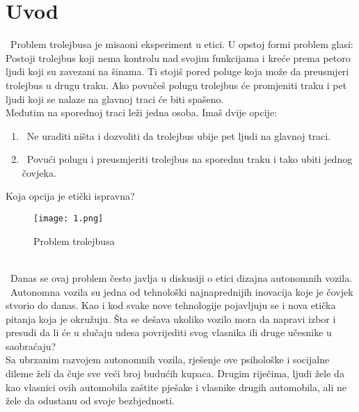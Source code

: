 \documentclass[a4paper]{article}
\begin{document}
\section{Uvod}
\label{sec:uvod}
\indent~Problem trolejbusa je misaoni eksperiment u etici. U opstoj formi problem glasi: Postoji trolejbus koji nema kontrolu nad svojim funkcijama i kreće prema petoro ljudi koji su zavezani na šinama. Ti stojiš pored poluge koja može da preusmjeri trolejbus u drugu traku. Ako povučeš polugu trolejbus će promjeniti traku i pet ljudi koji se nalaze na glavnoj traci će biti spašeno.\\
Međutim na sporednoj traci leži jedna osoba. Imaš dvije opcije:
\begin{enumerate}
\item~Ne uraditi ništa i dozvoliti da trolejbus ubije pet ljudi na glavnoj traci.
\item~Povući polugu i preusmjeriti trolejbus na sporednu traku i tako ubiti jednog čovjeka.
\end{enumerate}
Koja opcija je etički ispravna?
\begin{figure}[!h]
\begin{center}
\texttt{[image: 1.png]}
\label{1}
\caption{Problem trolejbusa}
\end{center}
\end{figure}\\
\indent~Danas se ovaj problem često javlja u diskusiji o etici dizajna autonomnih vozila.
\vspace{0.2cm}\\
\indent~Autonomna vozila su jedna od tehnološki najnaprednijih inovacija koje je čovjek stvorio do danas. Kao i kod svake nove tehnologije pojavljuju se i nova etička pitanja koja je okružuju. Šta se dešava ukoliko vozilo mora da napravi izbor i presudi da li će u slučaju udesa povrijediti svog vlasnika ili druge učesnike u saobraćaju?\\  Sa ubrzanim razvojem autonomnih vozila, rješenje ove psihološke i socijalne dileme želi da čuje sve veći broj budućih kupaca. Drugim riječima, ljudi žele da kao vlasnici ovih automobila zaštite pješake i vlasnike drugih automobila, ali ne žele da odustanu od svoje bezbjednosti.\cite{7}
\vspace{0.2cm}\\
\end{document}
